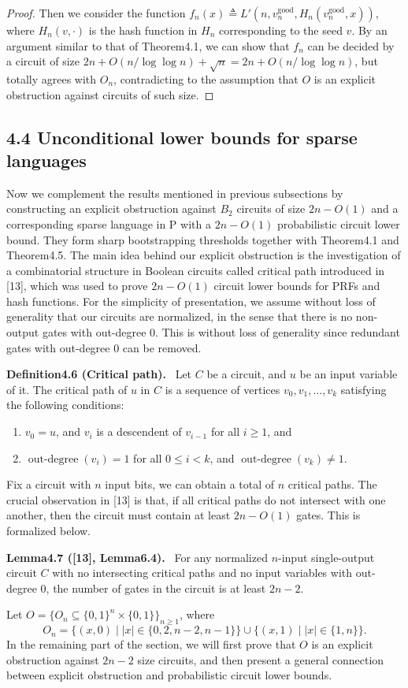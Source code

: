 \documentclass[10pt,a4paper]{article}
\newenvironment{authorclaim}[1]{\par\medskip\noindent\textbf{#1.}\ }{\par\medskip}
\begin{document}
\begin{proof}
Then we consider the function $f_n(x)\triangleq L'(n,v_n^{\mathrm{good}},H_n(v_n^{\mathrm{good}},x))$, where $H_n(v,\cdot)$ is the hash function in $H_n$ corresponding to the seed $v$. By an argument similar to that of Theorem4.1, we can show that $f_n$ can be decided by a circuit of size $2n+O(n/\log\log n)+\sqrt n=2n+O(n/\log\log n)$, but totally agrees with $O_n$, contradicting to the assumption that $O$ is an explicit obstruction against circuits of such size.
\end{proof}
\subsection*{4.4 Unconditional lower bounds for sparse languages}
Now we complement the results mentioned in previous subsections by constructing an explicit obstruction against $B_2$ circuits of size $2n-O(1)$ and a corresponding sparse language in P with a $2n-O(1)$ probabilistic circuit lower bound. They form sharp bootstrapping thresholds together with Theorem4.1 and Theorem4.5.
The main idea behind our explicit obstruction is the investigation of a combinatorial structure in Boolean circuits called critical path introduced in [13], which was used to prove $2n-O(1)$ circuit lower bounds for PRFs and hash functions.
For the simplicity of presentation, we assume without loss of generality that our circuits are normalized, in the sense that there is no non-output gates with out-degree 0. This is without loss of generality since redundant gates with out-degree 0 can be removed.
\begin{authorclaim}{Definition4.6 (Critical path)}
Let $C$ be a circuit, and $u$ be an input variable of it. The critical path of $u$ in $C$ is a sequence of vertices $v_0,v_1,\ldots,v_k$ satisfying the following conditions:
\begin{enumerate}
\item $v_0=u$, and $v_i$ is a descendent of $v_{i-1}$ for all $i\ge1$, and
\item $\operatorname{out\text{-}degree}(v_i)=1$ for all $0\le i<k$, and $\operatorname{out\text{-}degree}(v_k)\ne1$.
\end{enumerate}
\end{authorclaim}
Fix a circuit with $n$ input bits, we can obtain a total of $n$ critical paths. The crucial observation in [13] is that, if all critical paths do not intersect with one another, then the circuit must contain at least $2n-O(1)$ gates. This is formalized below.
\begin{authorclaim}{Lemma4.7 ([13], Lemma6.4)}
For any normalized $n$-input single-output circuit $C$ with no intersecting critical paths and no input variables with out-degree 0, the number of gates in the circuit is at least $2n-2$.
\end{authorclaim}
Let $O=\{O_n\subseteq\{0,1\}^n\times\{0,1\}\}_{n\ge1}$, where
\[O_n=\{(x,0)\mid|x|\in\{0,2,n-2,n-1\}\}\cup\{(x,1)\mid|x|\in\{1,n\}\}.\]
In the remaining part of the section, we will first prove that $O$ is an explicit obstruction against $2n-2$ size circuits, and then present a general connection between explicit obstruction and probabilistic circuit lower bounds.
\end{document}
